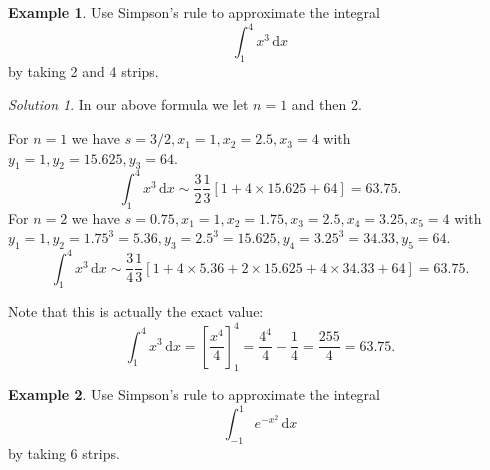 \documentclass[
  english,
  11pt,
  oneside]{book}
\newcommand{\slide}{}
\theoremstyle{definition}
\theoremstyle{definition}
\newtheorem{example}{Example}[chapter]
\theoremstyle{definition}
\theoremstyle{definition}
\theoremstyle{remark}
\newtheorem*{solution}{Solution}
\begin{document}
\slide

\begin{example}
Use Simpson's rule to approximate the integral
\[
\int_1^4x^3\,\mathrm{d}x
\]
by taking 2 and 4 strips.
\end{example}

\begin{solution}
In our above formula we let \(n=1\) and then \(2\).

For \(n=1\) we have \(s=3/2, x_1=1, x_2=2.5, x_3=4\) with \(y_1=1, y_2=15.625, y_3=64\).
\[
\int_1^4x^3\,\mathrm{d}x\sim\frac32\frac13\left[1+4\times15.625+64\right] = 63.75.
\]
For \(n=2\) we have \(s=0.75, x_1=1, x_2=1.75, x_3=2.5, x_4=3.25, x_5=4\) with \(y_1=1, y_2=1.75^3=5.36, y_3 = 2.5^3=15.625, y_4=3.25^3=34.33, y_5=64\).
\[
\int_1^4x^3\,\mathrm{d}x\sim\frac34\frac13\left[1+4\times5.36+2\times15.625+4\times34.33+64\right] = 63.75.
\]

Note that this is actually the exact value:
\[
\int_1^4x^3\,\mathrm{d}x = \left[\frac{x^4}4\right]_1^4 = \frac{4^4}4-\frac14 = \frac{255}4=63.75.
\]
\end{solution}

\slide

\begin{slidesonly}

\hbox{}
\slide
\hbox{}
\slide

\end{slidesonly}

\begin{example}
Use Simpson's rule to approximate the integral
\[
\int_{-1}^1e^{-x^2}\,\mathrm{d}x
\]
by taking 6 strips.
\end{example}
\end{document}
